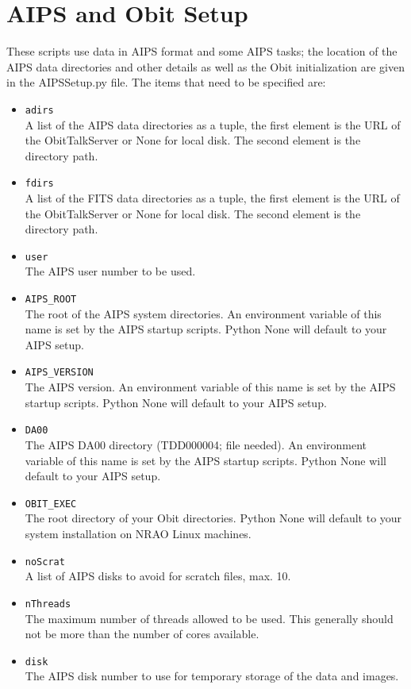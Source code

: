 \documentclass[11pt]{article}
\begin{document}
\section{AIPS and Obit Setup}\label{Setup}
These scripts use data in AIPS format and some AIPS tasks; the
location of the AIPS data directories and other details as well as the
Obit initialization are given in the AIPSSetup.py file.
The items that need to be specified are:
\begin{itemize}
\item {\tt adirs} \\
A list of the AIPS data directories as a tuple,  the first element is
the URL of the ObitTalkServer or None for local disk.
The second element is the directory path.
\item {\tt fdirs} \\
A list of the FITS data directories as a tuple,  the first element is
the URL of the ObitTalkServer or None for local disk.
The second element is the directory path.
\item {\tt user} \\
The AIPS user number to be used.
\item {\tt AIPS\_ROOT} \\
The root of the AIPS system directories.
An environment variable of this name is set by the AIPS startup scripts.
Python None will default to your AIPS setup.
\item {\tt AIPS\_VERSION} \\
The  AIPS version.
An environment variable of this name is set by the AIPS startup scripts.
Python None will default to your AIPS setup.
\item {\tt DA00} \\
The  AIPS DA00 directory (TDD000004; file needed).
An environment variable of this name is set by the AIPS startup
scripts.
Python None will default to your AIPS setup.
\item {\tt OBIT\_EXEC} \\
The root directory of your Obit directories.
Python None will default to your system installation on NRAO Linux machines.
\item {\tt noScrat} \\
A list of AIPS disks to avoid for scratch files, max. 10.
\item {\tt nThreads} \\
The maximum number of threads allowed to be used.
This generally should not be more than the number of cores available.
\item {\tt disk} \\
The AIPS disk number to use for temporary storage of the data and images.
\end{itemize}
\end{document}
